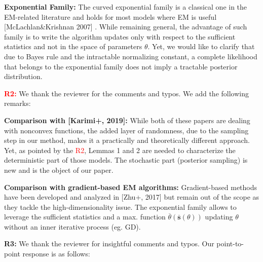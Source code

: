 \documentclass{article}
\begin{document}
\textbf{Exponential Family:} 
The curved exponential family is a classical one in the EM-related literature and holds for most models where  EM is useful [McLachlan\&Krishnan 2007] . 
While remaining general, the advantage of such family is to write the algorithm updates only with respect to the sufficient statistics and not in the space of parameters $\theta$. 
Yet, we would like to clarify that due to Bayes rule and the intractable normalizing constant, a complete likelihood that belongs to the exponential family does not imply a tractable posterior distribution.\vspace{-0.05in}


\textbf{\textcolor{red}{R2:}} We thank the reviewer for the comments and typos. We add the following remarks:\vspace{-0.05in}

\textbf{Comparison with [Karimi+, 2019]:} 
While both of these papers are dealing with nonconvex functions, the added layer of randomness, due to the sampling step in our method, makes it a practically and theoretically different approach.
Yet, as pointed by the \textcolor{red}{R2}, Lemmas 1 and 2 are needed to characterize the deterministic part of those models. 
The stochastic part (posterior sampling) is new and is the object of our paper.

\textbf{Comparison with gradient-based EM algorithms:} 
Gradient-based methods have been developed and analyzed in [Zhu+, 2017] but remain out of the scope as they tackle the high-dimensionality issue. 
The exponential family allows to leverage the sufficient statistics and a max. function $ \overline{\theta}( \overline{\textbf{s}}(\theta) )$ updating $\theta$ without an inner iterative process (eg. GD).\vspace{-0.05in}


\textbf{\textcolor{green!50!black}{R3:}} We thank the reviewer for insightful comments and typos. Our point-to-point response is as follows:\vspace{-0.05in}
\end{document}
